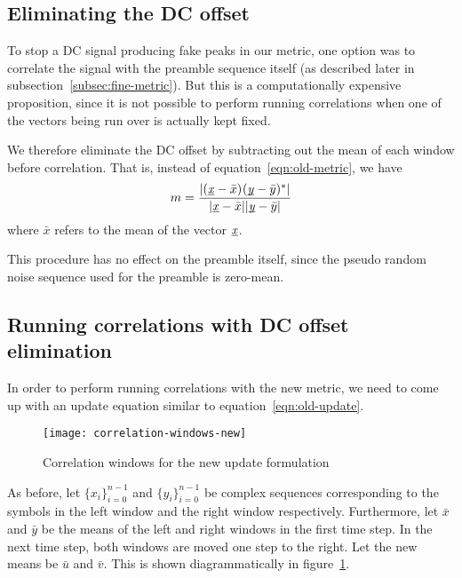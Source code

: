 
\subsection{Eliminating the DC offset}

To stop a DC signal producing fake peaks in our metric, one option was to
correlate the signal with the preamble sequence itself (as described later in
subsection~\ref{subsec:fine-metric}). But this is a computationally expensive
proposition, since it is not possible to perform running correlations when one
of the vectors being run over is actually kept fixed.

We therefore eliminate the DC offset by subtracting out the mean of each window
before correlation. That is, instead of equation~\ref{eqn:old-metric}, we have
\begin{equation} \label{eqn:new-metric}
	m = \frac{|\corr{(\ue{x}-\bar{x})}{(\ue{y}-\bar{y})}|}
	         {|\ue{x}-\bar{x}||\ue{y}-\bar{y}|}
\end{equation}
where $\bar{x}$ refers to the mean of the vector $\underbar{\emph{x}}$.

This procedure has no effect on the preamble itself, since the pseudo random
noise sequence used for the preamble is zero-mean.

\subsection{Running correlations with DC offset elimination}

In order to perform running correlations with the new metric, we need to
come up with an update equation similar to equation~\ref{eqn:old-update}.

\begin{figure}[h]
	\centering
	\texttt{[image: correlation-windows-new]}
	\caption{Correlation windows for the new update formulation}
	\label{fig:corr-win-new}
\end{figure}

As before, let $\{x_i\}_{i=0}^{n-1}$ and $\{y_i\}_{i=0}^{n-1}$ be complex
sequences corresponding to the symbols in the left window and the right window
respectively. Furthermore, let $\bar{x}$ and $\bar{y}$ be the means of the
left and right windows in the first time step. In the next time step, both
windows are moved one step to the right. Let the new means be $\bar{u}$ and
$\bar{v}$. This is shown diagrammatically in figure~\ref{fig:corr-win-new}.


